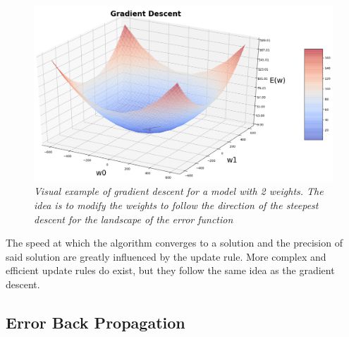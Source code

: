 \documentclass[12pt,a4paper]{report}
\begin{document}
\begin{figure}[H]
 \centering
 \includegraphics[scale=0.35]{./images/sgd.png}
 \caption{\it Visual example of gradient descent for a model with 2 weights. The idea is to modify the weights to follow the direction of the steepest descent for the landscape of the error function}
 \label{fig:gd}
\end{figure}
The speed at which the algorithm converges to a solution and the precision of said solution are greatly influenced by the update rule. More complex and efficient update rules do exist, but they follow the same idea as the gradient descent.

\subsection*{Error Back Propagation}
\end{document}
